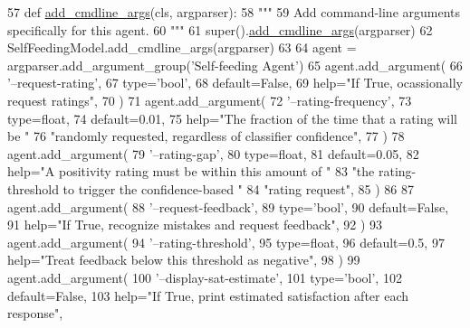 \begin{DoxyCode}
57     \textcolor{keyword}{def }\hyperlink{namespaceparlai_1_1agents_1_1drqa_1_1config_a62fdd5554f1da6be0cba185271058320}{add\_cmdline\_args}(cls, argparser):
58         \textcolor{stringliteral}{"""}
59 \textcolor{stringliteral}{        Add command-line arguments specifically for this agent.}
60 \textcolor{stringliteral}{        """}
61         super().\hyperlink{namespaceparlai_1_1agents_1_1drqa_1_1config_a62fdd5554f1da6be0cba185271058320}{add\_cmdline\_args}(argparser)
62         SelfFeedingModel.add\_cmdline\_args(argparser)
63 
64         agent = argparser.add\_argument\_group(\textcolor{stringliteral}{'Self-feeding Agent'})
65         agent.add\_argument(
66             \textcolor{stringliteral}{'--request-rating'},
67             type=\textcolor{stringliteral}{'bool'},
68             default=\textcolor{keyword}{False},
69             help=\textcolor{stringliteral}{"If True, ocassionally request ratings"},
70         )
71         agent.add\_argument(
72             \textcolor{stringliteral}{'--rating-frequency'},
73             type=float,
74             default=0.01,
75             help=\textcolor{stringliteral}{"The fraction of the time that a rating will be "}
76             \textcolor{stringliteral}{"randomly requested, regardless of classifier confidence"},
77         )
78         agent.add\_argument(
79             \textcolor{stringliteral}{'--rating-gap'},
80             type=float,
81             default=0.05,
82             help=\textcolor{stringliteral}{"A positivity rating must be within this amount of "}
83             \textcolor{stringliteral}{"the rating-threshold to trigger the confidence-based "}
84             \textcolor{stringliteral}{"rating request"},
85         )
86 
87         agent.add\_argument(
88             \textcolor{stringliteral}{'--request-feedback'},
89             type=\textcolor{stringliteral}{'bool'},
90             default=\textcolor{keyword}{False},
91             help=\textcolor{stringliteral}{"If True, recognize mistakes and request feedback"},
92         )
93         agent.add\_argument(
94             \textcolor{stringliteral}{'--rating-threshold'},
95             type=float,
96             default=0.5,
97             help=\textcolor{stringliteral}{"Treat feedback below this threshold as negative"},
98         )
99         agent.add\_argument(
100             \textcolor{stringliteral}{'--display-sat-estimate'},
101             type=\textcolor{stringliteral}{'bool'},
102             default=\textcolor{keyword}{False},
103             help=\textcolor{stringliteral}{"If True, print estimated satisfaction after each response"},

\end{DoxyCode}
